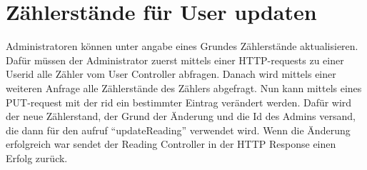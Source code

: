 \section{Zählerstände für User updaten}
Administratoren können unter angabe eines Grundes Zählerstände aktualisieren.
Dafür müssen der Administrator zuerst mittels einer HTTP-requests zu einer Userid alle Zähler vom User Controller abfragen. Danach wird mittels einer weiteren Anfrage alle Zählerstände des Zählers abgefragt. Nun kann mittels eines PUT-request mit der rid ein bestimmter Eintrag verändert werden. Dafür wird der neue Zählerstand, der Grund der Änderung und die Id des Admins versand, die dann für den aufruf ``updateReading'' verwendet wird. Wenn die Änderung erfolgreich war sendet der Reading Controller in der HTTP Response einen Erfolg zurück.